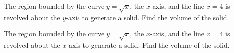 \newpage

\begin{example}
The region bounded by the curve $y=\sqrt x$, the $x$-axis, and the line $x=4$ is revolved about the $y$-axis to generate a solid.
Find the volume of the solid.
\end{example}

\newpage

\begin{example}
The region bounded by the curve $y=\sqrt x$, the $x$-axis, and the line $x=4$ is revolved about the $x$-axis to generate a solid.
Find the volume of the solid.
\end{example}
